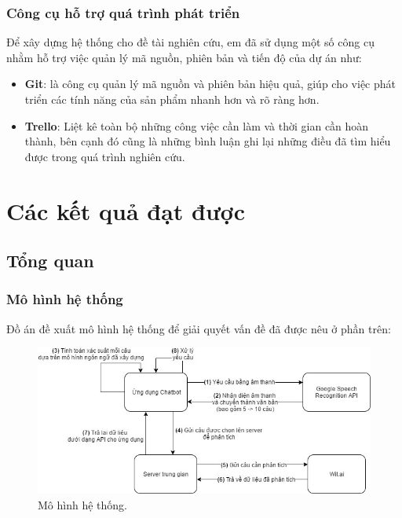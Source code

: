 \documentclass[12pt]{report}
\begin{document}
\section{Công cụ hỗ trợ quá trình phát triển}
Để xây dựng hệ thống cho đề tài nghiên cứu, em đã sử dụng một số công cụ nhằm hỗ trợ việc quản lý mã nguồn, phiên bản và tiến độ của dự án như:
\begin{itemize}
	\item \textbf{Git}: là công cụ quản lý mã nguồn và phiên bản hiệu quả, giúp cho việc phát triển các tính năng của sản phẩm nhanh hơn và rõ ràng hơn.
	\item \textbf{Trello}: Liệt kê toàn bộ những công việc cần làm và thời gian cần hoàn thành, bên cạnh đó cũng là những bình luận ghi lại những điều đã tìm hiểu được trong quá trình nghiên cứu.
\end{itemize}

\stopcontents[parts]

\part{Các kết quả đạt được}
\startcontents[parts]

\chapter{Tổng quan}
\section{Mô hình hệ thống}
Đồ án đề xuất mô hình hệ thống để giải quyết vấn đề đã được nêu ở phần trên:

\begin{figure}[H] \label{fig:VVC}
	\centering
		\includegraphics[width=15cm]{Pics/Chap2/VVC.jpg}
	\caption{Mô hình hệ thống.}
\end{figure}
\end{document}
